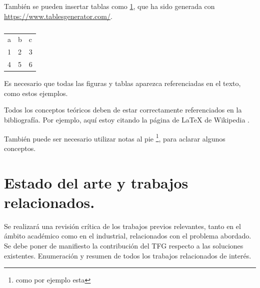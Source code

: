 También se pueden insertar tablas como \ref{tab:my-table}, que ha sido generada con \url{https://www.tablesgenerator.com/}.

\begin{table}[]
\begin{tabular}{lll}
a & b & c \\
1 & 2 & 3 \\
4 & 5 & 6
\end{tabular}
\caption{}
\label{tab:my-table}
\end{table}

Es necesario que todas las figuras y tablas aparezca referenciadas en el texto, como estos ejemplos.

Todos los conceptos teóricos deben de estar correctamente referenciados en la bibliografía. Por ejemplo, aquí estoy citando la página de \LaTeX{} de Wikipedia \cite{wiki:latex}.

También puede ser necesario utilizar notas al pie \footnote{como por ejemplo esta}, para aclarar algunos conceptos.


\section{Estado del arte y trabajos relacionados.}

Se realizará una revisión crítica de los trabajos previos relevantes, tanto en el ámbito académico como en el industrial, relacionados con el problema abordado. 
Se debe poner de manifiesto la contribución del TFG respecto a las soluciones existentes.
Enumeración y resumen de todos los trabajos relacionados de interés.